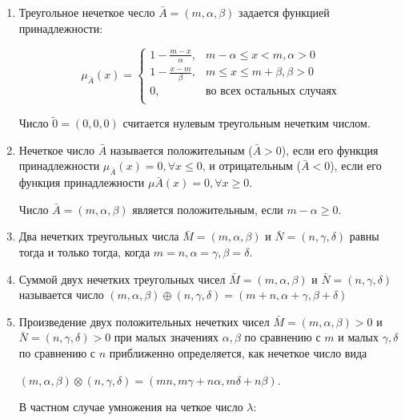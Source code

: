 \documentclass[12pt]{article}
\begin{document}
\begin{enumerate}
  \item Треугольное нечеткое чесло $ \bar{A} = (m, \alpha, \beta) $ задается
    функцией принадлежности: 


    $$
    \mu_{\bar{A}} (x) = \begin{cases}
      1 - \frac{m - x}{\alpha}, & m - \alpha \leq x < m, \alpha > 0  \\
      1 - \frac{x - m}{\beta}, & m \leq x \leq m + \beta, \beta > 0  \\
      0, & \text{во всех остальных случаях} \\
    \end{cases}
    $$

    Число $\tilde{0} = (0, 0, 0)$  считается нулевым треугольным нечетким
    числом.


  \item 
    Нечеткое число $\bar{A}$ называется положительным ($\bar{A} > 0$), если его
    функция принадлежности $\mu_{\bar{A}}(x) = 0, \forall x \leq 0$, и
    отрицательным ($\bar{A} < 0$), если его функция принадлежности
    $\mu{\bar{A}}(x) = 0, \forall x \geq 0$.

    Число $\bar{A} = (m, \alpha, \beta)$ является положительным, если $m -
    \alpha \geq 0$.

  \item
    Два нечетких треугольных числа $\bar{M} = (m, \alpha, \beta)$ и $\bar{N} =
    (n, \gamma, \delta)$ равны тогда и только тогда, когда 
    $m = n, \alpha = \gamma, \beta = \delta$.

  \item
    Суммой двух нечетких треугольных чисел $\bar{M} = (m, \alpha, \beta)$ и 
    $\bar{N} = (n, \gamma, \delta)$ называется число
    $ (m, \alpha, \beta) \oplus (n, \gamma, \delta) = (m + n, \alpha + \gamma,
    \beta + \delta) $

  \item
    Произведение двух положительных нечетких чисел $\bar{M} = (m, \alpha, \beta)
    > 0$ и $ \bar{N} = (n, \gamma, \delta) > 0 $ при малых значениях $\alpha,
    \beta$ по сравнению с $m$ и малых $\gamma, \delta$ по сравнению с $n$
    приближенно определяется, как нечеткое число вида

    $ (m, \alpha, \beta) \otimes (n, \gamma, \delta) = (mn, m\gamma + n \alpha,
    m\delta + n \beta)$.

    В частном случае умножения на четкое число $\lambda$:


\end{enumerate}
\end{document}
